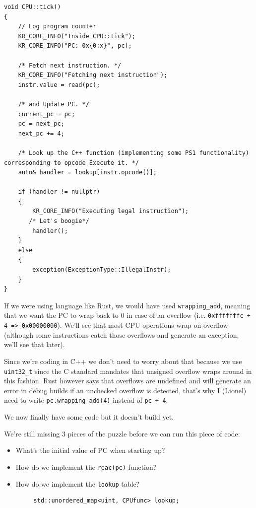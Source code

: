 \documentclass[a4paper]{article}
\newcommand{\code}[1] {\texttt{#1}}
\begin{document}
\begin{lstlisting}[caption={Ticking CPU.}, label={code:cputick}]
void CPU::tick()
{
    // Log program counter
    KR_CORE_INFO("Inside CPU::tick");
    KR_CORE_INFO("PC: 0x{0:x}", pc);
    
    /* Fetch next instruction. */
    KR_CORE_INFO("Fetching next instruction");
    instr.value = read(pc);
    
    /* and Update PC. */
    current_pc = pc;
    pc = next_pc;
    next_pc += 4;

    /* Look up the C++ function (implementing some PS1 functionality) corresponding to opcode Execute it. */
    auto& handler = lookup[instr.opcode()];

    if (handler != nullptr)
    {
        KR_CORE_INFO("Executing legal instruction");
       /* Let's boogie*/
        handler();
    }
    else
    {
        exception(ExceptionType::IllegalInstr);
    }
}
\end{lstlisting}

If we were using language like Rust, we would have used \code{wrapping\_add},
meaning that we want the PC to wrap back to 0 in case of an overflow (i.e. \code{0xfffffffc + 4 =>
0x00000000}). We'll see that most CPU operations wrap on overflow
(although some instructions catch those overflows and generate an
exception, we'll see that later).

Since we're coding in C++ we don't need to worry about that because we use
\code{uint32\_t} since the C standard mandates that unsigned overflow wraps
around in this fashion. Rust however says that overflows are undefined
and will generate an error in debug builds if an unchecked overflow is
detected, that's why I (Lionel) need to write \code{pc.wrapping\_add(4)} instead of
\code{pc + 4}.

We now finally have some code but it doesn't build yet.

We're still missing 3 pieces of the puzzle before we can run this
piece of code:

\begin{itemize}
 \item What's the initial value of PC when starting up?
 \item How do we implement the \code{reac(pc)} function?
 \item How do we implement the \code{lookup} table?
   \begin{lstlisting}
     std::unordered_map<uint, CPUfunc> lookup;
   \end{lstlisting}
\end{itemize}
\end{document}

